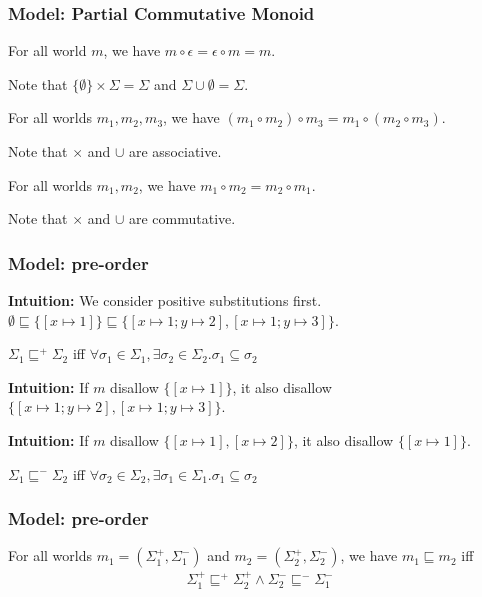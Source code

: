 \begin{frame}[fragile]
    \frametitle{Model: Partial Commutative Monoid}

\begin{lemma}
    For all world $m$, we have $m \circ \epsilon = \epsilon \circ m = m$.
\end{lemma}
Note that $\{\emptyset\} \times \Sigma = \Sigma$ and $\Sigma \cup \emptyset = \Sigma$.

\begin{lemma}[associativity]
    For all worlds $m_1, m_2, m_3$, we have $(m_1 \circ m_2) \circ m_3 = m_1 \circ (m_2 \circ m_3)$.
\end{lemma}
Note that $\times$ and $\cup$ are associative.

\begin{lemma}[commutativity]
    For all worlds $m_1, m_2$, we have $m_1 \circ m_2 = m_2 \circ m_1$.
\end{lemma}
Note that $\times$ and $\cup$ are commutative.

\end{frame}

\begin{frame}[fragile]
    \frametitle{Model: pre-order}

\textbf{Intuition:} We consider positive substitutions first. $\emptyset \sqsubseteq \{[x\mapsto 1]\} \sqsubseteq \{[x\mapsto 1;y\mapsto 2], [x\mapsto 1;y\mapsto 3]\}$.

\begin{definition}
$\Sigma_1 \sqsubseteq^+ \Sigma_2$ iff
$\forall \sigma_1 \in \Sigma_1, \exists \sigma_2 \in \Sigma_2. \sigma_1 \subseteq \sigma_2$
\end{definition}

\textbf{Intuition:} If $m$ disallow $\{[x\mapsto 1]\}$, it also disallow $\{[x\mapsto 1;y\mapsto 2], [x\mapsto 1;y\mapsto 3]\}$.

\textbf{Intuition:} If $m$ disallow $\{[x\mapsto 1],[x\mapsto 2]\}$, it also disallow $\{[x\mapsto 1]\}$.

\begin{definition}
    $\Sigma_1 \sqsubseteq^- \Sigma_2$ iff
    $\forall \sigma_2 \in \Sigma_2, \exists \sigma_1 \in \Sigma_1. \sigma_1 \subseteq \sigma_2$
\end{definition}

\end{frame}

\begin{frame}[fragile]
    \frametitle{Model: pre-order}

\begin{definition}
    For all worlds $m_1 = (\Sigma_1^+, \Sigma_1^-)$ and $m_2 = (\Sigma_2^+, \Sigma_2^-)$, we have $m_1 \sqsubseteq m_2$ iff
    \begin{align*}
    \Sigma_1^+ \sqsubseteq^+ \Sigma_2^+ \land \Sigma_2^- \sqsubseteq^- \Sigma_1^-
    \end{align*}\noindent
\end{definition}

\end{frame}


